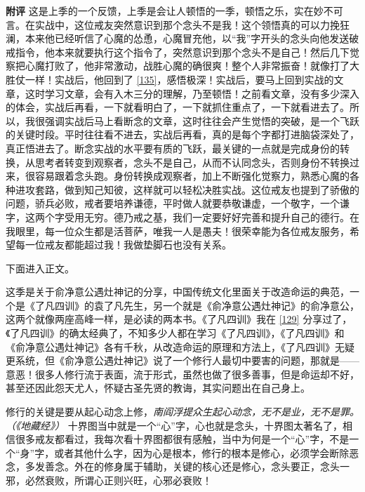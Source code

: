 \begin{case}
    \textbf{附评} 这是上季的一个反馈，上季是会让人顿悟的一季，顿悟之乐，实在妙不可言。在实战中，这位戒友突然意识到那个念头不是我！这个领悟真的可以力挽狂澜，本来他已经听信了心魔的怂恿，心魔冒充他，以“我”字开头的念头向他发送破戒指令，他本来就要执行这个指令了，突然意识到那个念头不是自己！然后几下觉察把心魔打败了，他非常激动，战胜心魔的确很爽！整个人非常振奋！就像打了大胜仗一样！实战后，他回到了 \ref{135}，感悟极深！实战后，要马上回到实战的文章，这时学习文章，会有入木三分的理解，乃至顿悟！之前看文章，没有多少深入的体会，实战后再看，一下就看明白了，一下就抓住重点了，一下就看进去了。所以，我很强调实战后马上看断念的文章，这时往往会产生觉悟的突破，是一个飞跃的关键时段。平时往往看不进去，实战后再看，真的是每个字都打进脑袋深处了，真正悟进去了。断念实战的水平要有质的飞跃，最关键的一点就是完成身份的转换，从思考者转变到观察者，念头不是自己，从而不认同念头，否则身份不转换过来，很容易跟着念头跑。身份转换成观察者，加上不断强化觉察力，熟悉心魔的各种进攻套路，做到知己知彼，这样就可以轻松决胜实战。这位戒友也提到了骄傲的问题，骄兵必败，戒者要培养谦德，平时做人就要恭敬谦虚，一个敬字，一个谦字，这两个字受用无穷。德乃戒之基，我们一定要好好完善和提升自己的德行。在我眼里，每一位众生都是活菩萨，唯我一人是愚夫！很荣幸能为各位戒友服务，希望每一位戒友都能超过我！我做垫脚石也没有关系。
\end{case}

下面进入正文。

这季是关于俞净意公遇灶神记的分享，中国传统文化里面关于改造命运的典范，一个是《了凡四训》的袁了凡先生，另一个就是《俞净意公遇灶神记》的俞净意公，这两个就像两座高峰一样，是必读的两本书。《了凡四训》我在 \ref{129} 分享过了，《了凡四训》的确太经典了，不知多少人都在学习《了凡四训》，《了凡四训》和《俞净意公遇灶神记》各有千秋，从改造命运的原理和方法上，《了凡四训》无疑更系统，但《俞净意公遇灶神记》说了一个修行人最切中要害的问题，那就是——意恶！很多人修行流于表面，流于形式，虽然也做了很多善事，但是命运却不好，甚至还因此怨天尤人，怀疑古圣先贤的教诲，其实问题出在自己身上。

修行的关键是要从起心动念上修，\textit{南阎浮提众生起心动念，无不是业，无不是罪。（《地藏经》）} 十界图当中就是一个“心”字，心也就是念头，十界图太著名了，相信很多戒友都看过，我每次看十界图都很有感触，当中为何是一个“心”字，不是一个“身”字，或者其他什么字，因为心是根本，修行的根本是修心，必须学会断除恶念，多发善念。外在的修身属于辅助，关键的核心还是修心，念头要正，念头一邪，必然衰败，所谓心正则兴旺，心邪必衰败！

